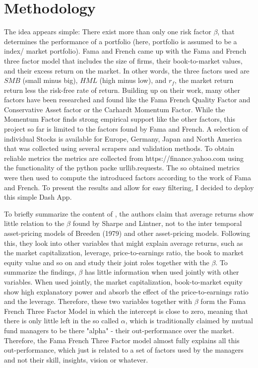\documentclass[11pt, a4paper, leqno]{article}
\begin{document}
\section{Methodology}
The idea appears simple: There exist more than only one risk factor $\beta$,  that determines the
performance of a portfolio (here, portfolio is assumed to be a index/ market portfolio).
Fama and French came up with the Fama and French three factor model that includes
the size of firms, their book-to-market values, and their excess return on the market. In other words, 
the three factors used are $SMB$ (small minus big), $HML$ (high minus low), and $r_f$, the
market return return less the risk-free rate of return. Building up on their work, many other
factors have been researched and found like the Fama French Quality Factor and Conservative 
Asset factor or the Carhardt Momentum Factor. While the Momentum Factor finds strong 
empirical support like the other factors, this project so far is limited to the factors 
found by Fama and French. 
A selection of individual Stocks is available for Europe, Germany, Japan and North America
that was collected using several scrapers and validation methods. To obtain reliable metrics
the metrics are collected from https://finance.yahoo.com
using the functionality of the python packe urllib.requests. The so obtained metrics were then 
used to compute the introduced factors according to the work of Fama and French. To present the 
results and allow for easy filtering, I decided to deploy this simple Dash App.

To briefly summarize the content of \cite{FF3}, the authors claim that average returns show little relation 
to the $\beta$ found by Sharpe and Lintner, not to the inter temporal asset-pricing models of Breeden (1979) 
and other asset-pricing models. Following this, they look into other variables that might explain average returns,
 such as the market capitalization, leverage, price-to-earnings ratio, the book to market equity
 value and so on and study their joint roles together with the $\beta$. To summarize the findings, 
 $\beta$ has little information when used jointly with other variables. When used jointly, the market capitalization,
  book-to-market equity show high explanatory power and absorb the effect of the price-to-earnings ratio and the leverage.
  Therefore, these two variables together with $\beta$ form the Fama French Three Factor Model in which the intercept 
  is close to zero, meaning that there is only little left in the so called $\alpha$, which is 
  traditionally claimed by mutual fund managers to be there "alpha" - their out-performance over the market.
  Therefore, the Fama French Three Factor model almost fully explains all this out-performance, which 
  just is related to a set of factors used by the managers and not their skill, insights, vision or whatever.
\end{document}

